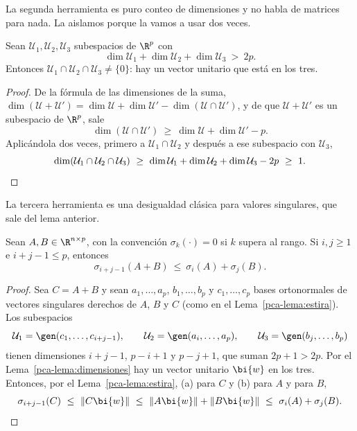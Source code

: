 La segunda herramienta es puro conteo de dimensiones y no habla de matrices
para nada. La aislamos porque la vamos a usar dos veces.

\begin{lema}\label{pca-lema:dimensiones}
Sean $\mathcal U_1,\mathcal U_2,\mathcal U_3$ subespacios de $\R^p$ con
\[
\dim\mathcal U_1+\dim\mathcal U_2+\dim\mathcal U_3\ >\ 2p .
\]
Entonces $\mathcal U_1\cap\mathcal U_2\cap\mathcal U_3\ne\{0\}$: hay un vector
unitario que está en los tres.
\end{lema}

\begin{proof}
De la fórmula de las dimensiones de la suma,
$\dim(\mathcal U+\mathcal U')=\dim\mathcal U+\dim\mathcal U'
-\dim(\mathcal U\cap\mathcal U')$, y de que $\mathcal U+\mathcal U'$ es un
subespacio de $\R^p$, sale
\[
\dim(\mathcal U\cap\mathcal U')\ \ge\ \dim\mathcal U+\dim\mathcal U'-p .
\]
Aplicándola dos veces, primero a $\mathcal U_1\cap\mathcal U_2$ y después a
ese subespacio con $\mathcal U_3$,
\[
\dim(\mathcal U_1\cap\mathcal U_2\cap\mathcal U_3)
\ \ge\ \dim\mathcal U_1+\dim\mathcal U_2+\dim\mathcal U_3-2p\ \ge\ 1 . \qedhere
\]
\end{proof}

La tercera herramienta es una desigualdad clásica para valores singulares, que
sale del lema anterior.

\begin{lema}\label{pca-lema:weyl}
Sean $A,B\in\R^{n\times p}$, con la convención $\sigma_k(\cdot)=0$ si $k$
supera al rango. Si $i,j\ge1$ e $i+j-1\le p$, entonces
\begin{equation}\label{pca-eq:weyl}
\sigma_{i+j-1}(A+B)\ \le\ \sigma_i(A)+\sigma_j(B) .
\end{equation}
\end{lema}

\begin{proof}
Sea $C=A+B$ y sean $a_1,\dots,a_p$, $b_1,\dots,b_p$ y $c_1,\dots,c_p$ bases
ortonormales de vectores singulares derechos de $A$, $B$ y $C$ (como en el
Lema~\ref{pca-lema:estira}). Los subespacios
\[
\mathcal U_1=\gen(c_1,\dots,c_{i+j-1}),\qquad
\mathcal U_2=\gen(a_i,\dots,a_p),\qquad
\mathcal U_3=\gen(b_j,\dots,b_p)
\]
tienen dimensiones $i+j-1$, $p-i+1$ y $p-j+1$, que suman $2p+1>2p$. Por el
Lema~\ref{pca-lema:dimensiones} hay un vector unitario $\bi{w}$ en los tres.
Entonces, por el Lema~\ref{pca-lema:estira},
(a) para $C$ y (b) para $A$ y para $B$,
\[
\sigma_{i+j-1}(C)\ \le\ \|C\bi{w}\|\ \le\ \|A\bi{w}\|+\|B\bi{w}\|\ \le\ \sigma_i(A)+\sigma_j(B). \qedhere
\]
\end{proof}

